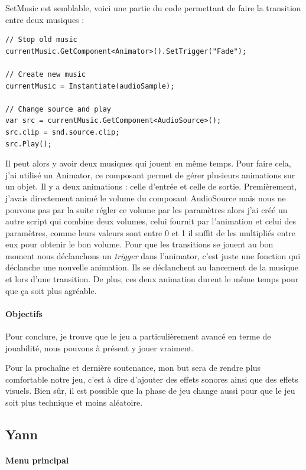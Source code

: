 \documentclass{article}
\begin{document}
SetMusic est semblable, voici une partie du code permettant de faire la transition entre deux musiques :
\begin{lstlisting}
// Stop old music
currentMusic.GetComponent<Animator>().SetTrigger("Fade");

// Create new music
currentMusic = Instantiate(audioSample);

// Change source and play
var src = currentMusic.GetComponent<AudioSource>();
src.clip = snd.source.clip;
src.Play();
\end{lstlisting}

Il peut alors y avoir deux musiques qui jouent en même temps. Pour faire cela, j'ai utilisé un Animator, ce composant permet de gérer plusieurs animations sur un objet. Il y a deux animations : celle d'entrée et celle de sortie. Premièrement, j'avais directement animé le volume du composant AudioSource mais nous ne pouvons pas par la suite régler ce volume par les paramètres alors j'ai créé un autre script qui combine deux volumes, celui fournit par l'animation et celui des paramètres, comme leurs valeurs sont entre 0 et 1 il suffit de les multipliés entre eux pour obtenir le bon volume. Pour que les transitions se jouent au bon moment nous déclanchons un \emph{trigger} dans l'animator, c'est juste une fonction qui déclanche une nouvelle animation. Ils se déclanchent au lancement de la musique et lors d'une transition. De plus, ces deux animation durent le même temps pour que ça soit plus agréable.

\paragraph{Objectifs}

Pour conclure, je trouve que le jeu a particulièrement avancé en terme de jouabilité, nous pouvons à présent y jouer vraiment.

Pour la prochaîne et dernière soutenance, mon but sera de rendre plus comfortable notre jeu, c'est à dire d'ajouter des effets sonores ainsi que des effets visuels. Bien sûr, il est possible que la phase de jeu change aussi pour que le jeu soit plus technique et moins aléatoire. 



\newpage
\subsection{Yann}

\paragraph{Menu principal}
\end{document}
